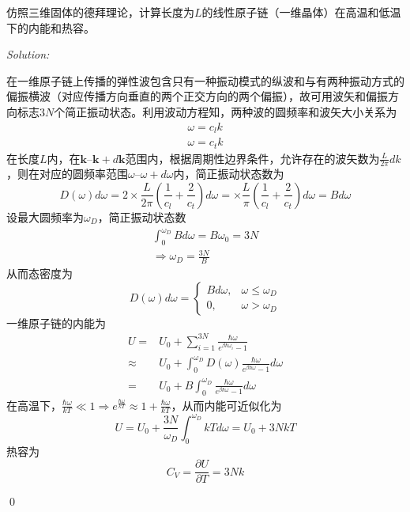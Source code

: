\documentclass[12pt,a4paper]{article}
\newenvironment{problem}[2][Problem]{\begin{trivlist}
\item[\hskip \labelsep {\bfseries #1}\hskip \labelsep {\bfseries #2.}]}{\end{trivlist}}
\newenvironment{sol}
    {\emph{Solution:}
    }
    {
    \qed
    }
\begin{document}
\begin{problem}{9.9}
仿照三维固体的德拜理论，计算长度为$L$的线性原子链（一维晶体）在高温和低温下的内能和热容。
\end{problem}
\begin{sol}
在一维原子链上传播的弹性波包含只有一种振动模式的纵波和与有两种振动方式的偏振横波（对应传播方向垂直的两个正交方向的两个偏振），故可用波矢和偏振方向标志$3N$个简正振动状态。利用波动方程知，两种波的圆频率和波矢大小关系为
\begin{gather}
\omega=c_lk\\
\omega=c_tk
\end{gather}
在长度$L$内，在$\bm{k}$--$\bm{k}+d\bm{k}$范围内，根据周期性边界条件，允许存在的波矢数为$\frac{L}{2\pi}dk$，则在对应的圆频率范围$\omega$--$\omega+d\omega$内，简正振动状态数为
\begin{equation}
D(\omega)d\omega=2\times\frac{L}{2\pi}\left(\frac{1}{c_l}+\frac{2}{c_t}\right)d\omega=\times\frac{L}{\pi}\left(\frac{1}{c_l}+\frac{2}{c_t}\right)d\omega=Bd\omega
\end{equation}
设最大圆频率为$\omega_D$，简正振动状态数
\begin{gather}
\int_0^{\omega_D}Bd\omega=B\omega_0=3N\\
\Longrightarrow\omega_D=\frac{3N}{B}
\end{gather}
从而态密度为
\begin{equation}
D(\omega)d\omega=\left\{\begin{array}{ll}
Bd\omega,&\omega\leq\omega_D\\
0,&\omega>\omega_D
\end{array}\right.
\end{equation}
一维原子链的内能为
\begin{align}
\nonumber U=&U_0+\sum_{i=1}^{3N}\frac{\hbar\omega}{e^{\beta\hbar\omega_i}-1}\\
\nonumber\approx&U_0+\int_0^{\omega_D}D(\omega)\frac{\hbar\omega}{e^{\beta\hbar\omega}-1}d\omega\\
=&U_0+B\int_0^{\omega_D}\frac{\hbar\omega}{e^{\beta\hbar\omega}-1}d\omega
\end{align}
在高温下，$\frac{\hbar\omega}{kT}\ll1\Longrightarrow e^{\frac{\hbar\omega}{kT}}\approx1+\frac{\hbar\omega}{kT}$，从而内能可近似化为
\begin{equation}
U=U_0+\frac{3N}{\omega_D}\int_0^{\omega_D}kTd\omega=U_0+3NkT
\end{equation}
热容为
\begin{equation}
C_V=\frac{\partial U}{\partial T}=3Nk
\end{equation}

\end{sol}
\end{document}
